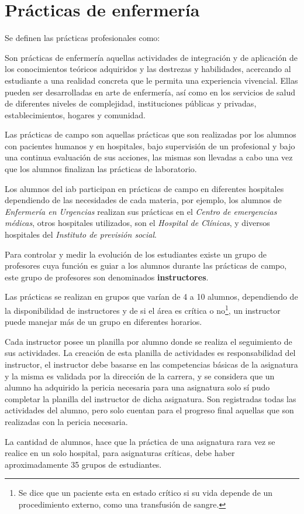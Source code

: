\section{Prácticas de enfermería}
\label{sec:practica_hos}

Se definen las prácticas profesionales como\cite{iab:est_enfemeria}:

\begin{displayquote}

Son prácticas de enfermería aquellas actividades de integración y de aplicación
de los conocimientos teóricos adquiridos y las destrezas y habilidades,
acercando al estudiante a una realidad concreta que le permita una experiencia
vivencial. Ellas pueden ser desarrolladas en arte de enfermería, así como en los
servicios de salud de diferentes niveles de complejidad, instituciones públicas
y privadas, establecimientos, hogares y comunidad.

\end{displayquote}

Las prácticas de campo son aquellas prácticas que son realizadas por los alumnos
con pacientes humanos y en hospitales, bajo supervisión de un profesional y bajo
una continua evaluación de sus acciones, las mismas son llevadas a cabo una vez
que los alumnos finalizan las prácticas de laboratorio.

Los alumnos del \Gls{iab} participan en prácticas de campo en diferentes
hospitales dependiendo de las necesidades de cada materia, por ejemplo, los
alumnos de \textit{Enfermería en Urgencias} realizan sus prácticas en el
\textit{Centro de emergencias médicas}, otros hospitales utilizados, son el
\textit{Hospital de Clínicas}, y diversos hospitales del \textit{Instituto de
    previsión social}.

Para controlar y medir la evolución de los estudiantes existe un grupo de
profesores cuya función es guiar a los alumnos durante las prácticas de campo,
este grupo de profesores son denominados \textbf{instructores}.

Las prácticas se realizan en grupos que varían de 4 a 10 alumnos, dependiendo de
la disponibilidad de instructores y de si el área es crítica o no\footnote{Se
    dice que un paciente esta en estado crítico si su vida depende de un
    procedimiento externo, como una transfusión de sangre.}, un instructor puede
manejar más de un grupo en diferentes horarios. 

Cada instructor posee un planilla por alumno donde se realiza el seguimiento de
sus actividades. La creación de esta planilla de actividades es responsabilidad
del instructor, el instructor debe basarse en las competencias básicas de la
asignatura y la misma es validada por la dirección de la carrera, y se considera
que un alumno ha adquirido la pericia necesaria para una asignatura solo sí pudo
completar la planilla del instructor de dicha asignatura. Son registradas todas
las actividades del alumno, pero solo cuentan para el progreso final aquellas
que son realizadas con la pericia necesaria.

La cantidad de alumnos, hace que la práctica de una asignatura rara vez se
realice en un solo hospital, para asignaturas críticas, debe haber
aproximadamente 35 grupos de estudiantes.
